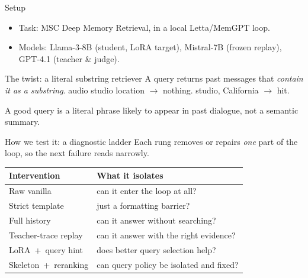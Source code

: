 \documentclass[10pt,aspectratio=169]{beamer}
\newcommand{\code}[1]{{\small\ttfamily #1}}
\begin{document}
\begin{frame}{Setup}
  \begin{itemize}
    \item \alert{Task:} MSC Deep Memory Retrieval, in a local Letta/MemGPT loop.
    \item \alert{Models:} Llama-3-8B (student, LoRA target), Mistral-7B (frozen replay),
          GPT-4.1 (teacher \& judge).
  \end{itemize}
  \vspace{0.8em}
  \begin{alertblock}{The twist: a literal substring retriever}
    A query returns past messages that \emph{contain it as a substring}.
    \smallskip
    \code{audio studio location} $\rightarrow$ nothing.\quad
    \code{studio}, \code{California} $\rightarrow$ hit.
  \end{alertblock}
  \vspace{0.4em}
  A good query is a \alert{literal phrase likely to appear in past dialogue},
  not a semantic summary.
\end{frame}

\begin{frame}{How we test it: a diagnostic ladder}
  Each rung removes or repairs \emph{one} part of the loop, so the next failure
  reads narrowly.
  \vspace{0.7em}
  \begin{center}\small
  \begin{tabular}{ll}
    \toprule
    \textbf{Intervention} & \textbf{What it isolates} \\
    \midrule
    Raw vanilla            & can it enter the loop at all? \\
    Strict template        & just a formatting barrier? \\
    Full history           & can it answer without searching? \\
    Teacher-trace replay    & can it answer with the right evidence? \\
    LoRA \,+\, query hint   & does better query selection help? \\
    Skeleton \,+\, reranking & can query policy be isolated and fixed? \\
    \bottomrule
  \end{tabular}
  \end{center}
\end{frame}

\end{document}
